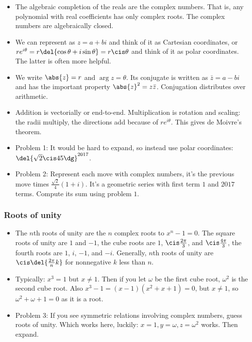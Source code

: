 \documentclass[10pt,paper=letter]{scrartcl}
\begin{document}
\begin{itemize}
  \item The algebraic completion of the reals are the complex numbers. That is, any polynomial with real coefficients has only complex roots. The complex numbers are algebraically closed.
  \item We can represent as $z = a + bi$ and think of it as Cartesian coordinates, or $re^{i\theta} = r\del{\cos\theta + i \sin\theta} = r\cis\theta$ and think of it as polar coordinates. The latter is often more helpful.
  \item We write $\abs{z} = r$ and $\arg z = \theta$. Its conjugate is written as $\bar{z} = a - bi$ and has the important property $\abs{z}^2 = z\bar{z}$. Conjugation distributes over arithmetic.
  \item Addition is vectorially or end-to-end. Multiplication is rotation and scaling: the radii multiply, the directions add because of $re^{i\theta}$. This gives de Moivre's theorem.
  \item Problem 1: It would be hard to expand, so instead use polar coordinates: $\del{\sqrt2\cis45\dg}^{2017}$.
  \item Problem 2: Represent each move with complex numbers, it's the previous move times $\frac{\sqrt2}4(1+i)$. It's a geometric series with first term $1$ and $2017$ terms. Compute its sum using problem $1$.
\end{itemize}

\newpage

\subsubsection*{Roots of unity}

\begin{itemize}
  \item The $n$th roots of unity are the $n$ complex roots to $x^n - 1 = 0$. The square roots of unity are $1$ and $-1$, the cube roots are $1$, $\cis\frac{2\pi}{3}$, and $\cis\frac{4\pi}{3}$, the fourth roots are $1$, $i$, $-1$, and $-i$. Generally, $n$th roots of unity are $\cis\del{\frac{2\pi}{n}k}$ for nonnegative $k$ less than $n$.
  \item Typically: $x^3 = 1$ but $x \neq 1$. Then if you let $\omega$ be the first cube root, $\omega^2$ is the second cube root. Also $x^3 - 1 = (x - 1)(x^2 +x + 1) = 0$, but $x \neq 1$, so $\omega^2 + \omega + 1 = 0$ as it is a root.
  \item Problem 3: If you see symmetric relations involving complex numbers, guess roots of unity. Which works here, luckily: $x = 1, y = \omega, z = \omega^2$ works. Then expand.
\end{itemize}
\end{document}
